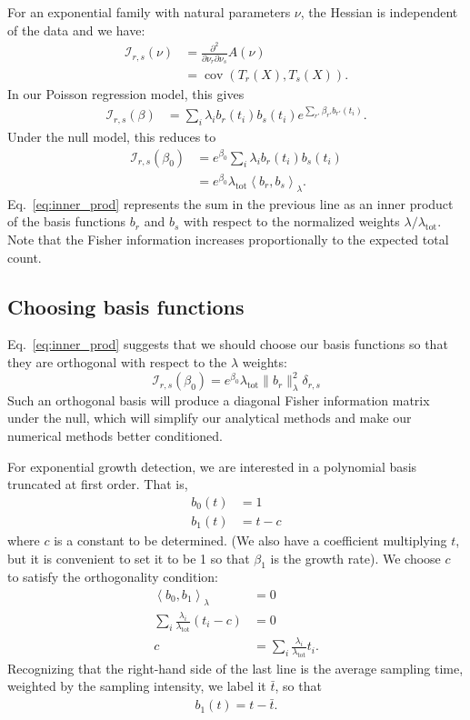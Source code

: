 \documentclass[12pt, letterpaper]{article}
\newcommand{ \lambtot }{\lambda_{\text{tot}}}
\DeclareMathOperator{\cov}{cov}
\begin{document}
For an exponential family with natural parameters $\nu$, the Hessian is independent of the data and we have:
\begin{align}
    \mathcal{I}_{r,s}(\nu) &= \frac{\partial^2}{\partial \nu_r \partial \nu_s} A(\nu)\\
                           &= \cov\left(T_r(X), T_s(X)\right).
\end{align}
In our Poisson regression model, this gives
\begin{align}
    \mathcal{I}_{r,s}(\beta) &= \sum_i \lambda_i b_r(t_i) b_s(t_i) e^{\sum_{r'} \beta_{r'} b_{r'}(t_i)}.
\end{align}
Under the null model, this reduces to
\begin{align}
    \mathcal{I}_{r,s}(\beta_0) &= e^{\beta_0} \sum_i \lambda_i b_r(t_i) b_s(t_i) \\
                               &= e^{\beta_0} \lambtot \left< b_r, b_s \right>_\lambda. \label{eq:inner_prod}
\end{align}
Eq.~\ref{eq:inner_prod} represents the sum in the previous line as an inner product of the basis functions $b_r$ and $b_s$ with respect to the normalized weights $\lambda / \lambtot$.
Note that the Fisher information increases proportionally to the expected total count.

\subsection{Choosing basis functions}

Eq.~\ref{eq:inner_prod} suggests that we should choose our basis functions so that they are orthogonal with respect to the $\lambda$ weights:
\begin{equation}
    \mathcal{I}_{r,s}(\beta_0) = e^{\beta_0} \lambtot \| b_r \|_{\lambda}^2 \delta_{r,s}
    \label{eq:i_ortho}
\end{equation}
Such an orthogonal basis will produce a diagonal Fisher information matrix under the null, which will simplify our analytical methods and make our numerical methods better conditioned.

For exponential growth detection, we are interested in a polynomial basis truncated at first order.
That is,
\begin{align}
    b_0(t) &= 1 \\
    b_1(t) &= t - c
\end{align}
where $c$ is a constant to be determined.
(We also have a coefficient multiplying $t$, but it is convenient to set it to be 1 so that $\beta_1$ is the growth rate).
We choose $c$ to satisfy the orthogonality condition:
\begin{align}
    \left<b_0, b_1\right>_\lambda &= 0 \\
    \sum_i \frac{\lambda_i}{\lambtot} (t_i - c) &= 0 \\
    c &= \sum_i \frac{\lambda_i}{\lambtot} t_i.
\end{align}
Recognizing that the right-hand side of the last line is the average sampling time, weighted by the sampling intensity, we label it $\bar{t}$, so that
\begin{align}
    b_1(t) = t - \bar{t}.
\end{align}
\end{document}
